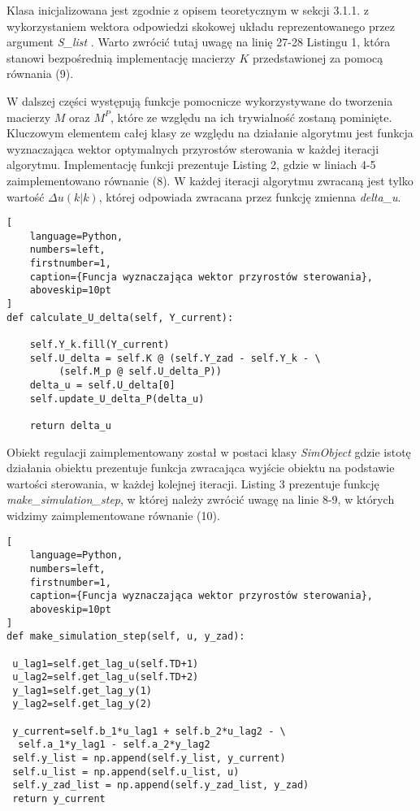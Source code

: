 Klasa inicjalizowana jest zgodnie z opisem teoretycznym w sekcji 3.1.1. z wykorzystaniem wektora odpowiedzi skokowej układu reprezentowanego przez argument \emph{ S{\_}list }. Warto zwrócić tutaj uwagę na linię 27-28 Listingu 1, która stanowi bezpośrednią implementację macierzy \(K\) przedstawionej za pomocą równania (9).
\par W dalszej części występują funkcje pomocnicze wykorzystywane do tworzenia macierzy \(M\) oraz \(M^P\), które ze względu na ich trywialność zostaną pominięte. Kluczowym elementem całej klasy ze względu na działanie algorytmu jest funkcja wyznaczająca wektor optymalnych przyrostów sterowania w każdej iteracji algorytmu. Implementację funkcji prezentuje Listing 2, gdzie w liniach 4-5 zaimplementowano równanie (8). W każdej iteracji algorytmu zwracaną jest tylko wartość \(\Delta u(k|k) \), której odpowiada zwracana przez funkcję zmienna \emph{delta{\_}u}.

\begin{addmargin}[6mm]{0mm}
\begin{lstlisting}[
    language=Python,
    numbers=left,
    firstnumber=1,
    caption={Funcja wyznaczająca wektor przyrostów sterowania},
    aboveskip=10pt
]
def calculate_U_delta(self, Y_current): 

	self.Y_k.fill(Y_current)
	self.U_delta = self.K @ (self.Y_zad - self.Y_k - \
		 (self.M_p @ self.U_delta_P))
	delta_u = self.U_delta[0]
	self.update_U_delta_P(delta_u)

	return delta_u
\end{lstlisting}
\end{addmargin}

\par Obiekt regulacji zaimplementowany został w postaci klasy \emph{SimObject} gdzie istotę działania obiektu prezentuje funkcja zwracająca wyjście obiektu na podstawie wartości sterowania, w każdej kolejnej iteracji. Listing 3 prezentuje funkcję \emph{make{\_}simulation{\_}step}, w której należy zwrócić uwagę na linie 8-9, w których widzimy zaimplementowane równanie (10). 
\begin{addmargin}[10mm]{0mm}
\begin{lstlisting}[
    language=Python,
    numbers=left,
    firstnumber=1,
    caption={Funcja wyznaczająca wektor przyrostów sterowania},
    aboveskip=10pt
]
def make_simulation_step(self, u, y_zad):
		
 u_lag1=self.get_lag_u(self.TD+1)
 u_lag2=self.get_lag_u(self.TD+2)
 y_lag1=self.get_lag_y(1)
 y_lag2=self.get_lag_y(2)

 y_current=self.b_1*u_lag1 + self.b_2*u_lag2 - \
  self.a_1*y_lag1 - self.a_2*y_lag2
 self.y_list = np.append(self.y_list, y_current)
 self.u_list = np.append(self.u_list, u)
 self.y_zad_list = np.append(self.y_zad_list, y_zad)
 return y_current
\end{lstlisting}
\end{addmargin}
 
